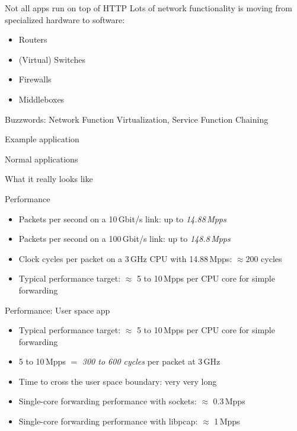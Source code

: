 \documentclass[NET,english,aspectratio=169,notitleframe]{tumbeamer}
\begin{document}
\begin{frame}{Not all apps run on top of HTTP}
Lots of network functionality is moving from specialized hardware to software:
\begin{itemize}
\item Routers
\item (Virtual) Switches
\item Firewalls
\item Middleboxes
\end{itemize}
Buzzwords: Network Function Virtualization, Service Function Chaining
\end{frame}

\begin{frame}{Example application}
\end{frame}


\begin{frame}{Normal applications}
\end{frame}

\begin{frame}{What it really looks like}
\end{frame}

\begin{frame}{Performance}
\begin{itemize}
\item Packets per second on a 10\,Gbit/s link: up to \emph{14.88\,Mpps}
\item<2-> Packets per second on a 100\,Gbit/s link: up to \emph{148.8\,Mpps}
\item<3-> Clock cycles per packet on a 3\,GHz CPU with 14.88\,Mpps: $\approx 200$ cycles
\item<3-> Typical performance target: $\approx$ 5 to 10\,Mpps per CPU core for simple forwarding
\end{itemize}
\end{frame}

\begin{frame}{Performance: User space app}
\begin{itemize}
\item<1-> Typical performance target: $\approx$ 5 to 10\,Mpps per CPU core for simple forwarding
\item<1-> 5 to 10\,Mpps $=$ \emph{300 to 600 cycles} per packet at 3\,GHz
\vspace{1em}
\item<2-> Time to cross the user space boundary: very very long
\vspace{1em}
\item<3-> Single-core forwarding performance with sockets: $\approx$ 0.3\,Mpps
\item<3-> Single-core forwarding performance with libpcap: $\approx$ 1\,Mpps
\end{itemize}
\end{frame}
\end{document}
